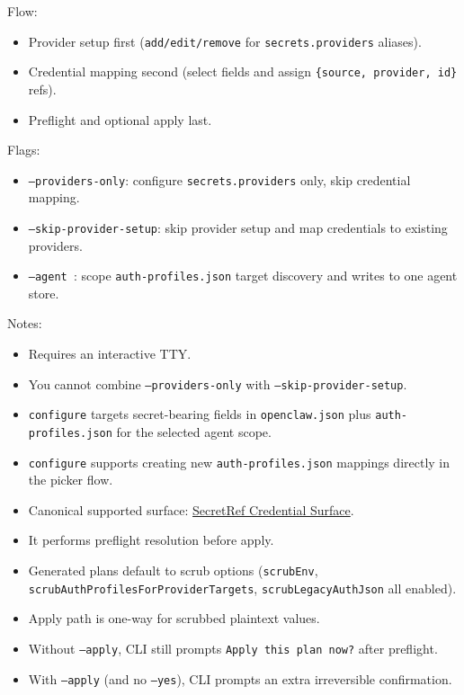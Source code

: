 Flow:

\begin{itemize}
  \item Provider setup first (\texttt{add/edit/remove} for \texttt{secrets.providers} aliases).
  \item Credential mapping second (select fields and assign \texttt{\{source, provider, id\}} refs).
  \item Preflight and optional apply last.
\end{itemize}


Flags:

\begin{itemize}
  \item \texttt{--providers-only}: configure \texttt{secrets.providers} only, skip credential mapping.
  \item \texttt{--skip-provider-setup}: skip provider setup and map credentials to existing providers.
  \item \texttt{--agent }: scope \texttt{auth-profiles.json} target discovery and writes to one agent store.
\end{itemize}


Notes:

\begin{itemize}
  \item Requires an interactive TTY.
  \item You cannot combine \texttt{--providers-only} with \texttt{--skip-provider-setup}.
  \item \texttt{configure} targets secret-bearing fields in \texttt{openclaw.json} plus \texttt{auth-profiles.json} for the selected agent scope.
  \item \texttt{configure} supports creating new \texttt{auth-profiles.json} mappings directly in the picker flow.
  \item Canonical supported surface: \href{/reference/secretref-credential-surface}{SecretRef Credential Surface}.
  \item It performs preflight resolution before apply.
  \item Generated plans default to scrub options (\texttt{scrubEnv}, \texttt{scrubAuthProfilesForProviderTargets}, \texttt{scrubLegacyAuthJson} all enabled).
  \item Apply path is one-way for scrubbed plaintext values.
  \item Without \texttt{--apply}, CLI still prompts \texttt{Apply this plan now?} after preflight.
  \item With \texttt{--apply} (and no \texttt{--yes}), CLI prompts an extra irreversible confirmation.
\end{itemize}


